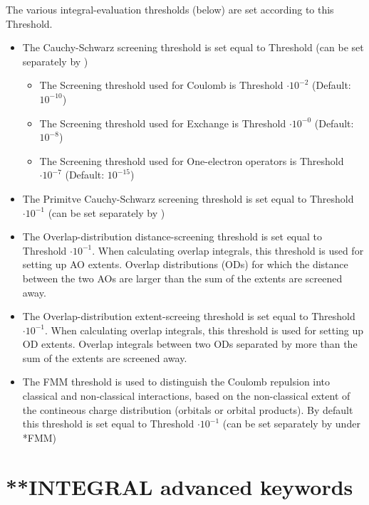 \begin{description}
The various integral-evaluation thresholds (below) are set according to this Threshold. 
\begin{itemize}
\item The Cauchy-Schwarz screening threshold is set equal to Threshold (can be set separately by )
\begin{itemize}
  \item The Screening threshold used for Coulomb is Threshold $\cdot 10^{-2}$ (Default: $10^{-10}$) 
  \item The Screening threshold used for Exchange is Threshold $\cdot 10^{-0}$ (Default: $10^{-8}$)
  \item The Screening threshold used for One-electron operators is Threshold $\cdot 10^{-7}$ (Default: $10^{-15}$)
\end{itemize}
\item The Primitve Cauchy-Schwarz screening threshold is set equal to Threshold$\cdot 10^{-1}$  (can be set separately by )
\item The Overlap-distribution distance-screening threshold is set equal to 
      Threshold $\cdot 10^{-1}$.
      When calculating overlap integrals, this threshold 
      is used for setting up AO extents. Overlap distributions (ODs) for which the 
      distance between the two AOs are larger than the sum of the extents are 
      screened away. %
\item The Overlap-distribution extent-screeing threshold is set equal to 
      Threshold $\cdot 10^{-1}$. When calculating overlap integrals, this threshold 
      is used for setting up OD extents. Overlap integrals between two ODs separated
      by more than the sum of the extents are screened away. %
\item The FMM threshold is used to distinguish the Coulomb repulsion into classical and non-classical interactions, based on
      the non-classical extent of the contineous charge distribution (orbitals or orbital products). By default this threshold 
      is set equal to Threshold $\cdot 10^{-1}$ (can be set separately by  under *FMM)
\end{itemize}
\end{description}

\section{**INTEGRAL advanced keywords}\label{sec:integral}

